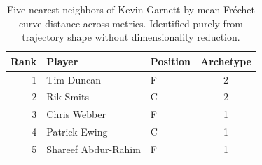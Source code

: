 \begin{table}[htbp]
  \centering\small
  \begin{tabular}{rllc}
    \toprule
    Rank & Player & Position & Archetype \\
    \midrule
    1 & Tim Duncan & F & 2 \\
    2 & Rik Smits & C & 2 \\
    3 & Chris Webber & F & 1 \\
    4 & Patrick Ewing & C & 1 \\
    5 & Shareef Abdur-Rahim & F & 1 \\
    \bottomrule
  \end{tabular}
  \caption{Five nearest neighbors of Kevin Garnett by mean Fr\'{e}chet curve distance across metrics. Identified purely from trajectory shape without dimensionality reduction.}
  \label{tab:Kevin_Garnett_frechet_curve_neighbors}
\end{table}


